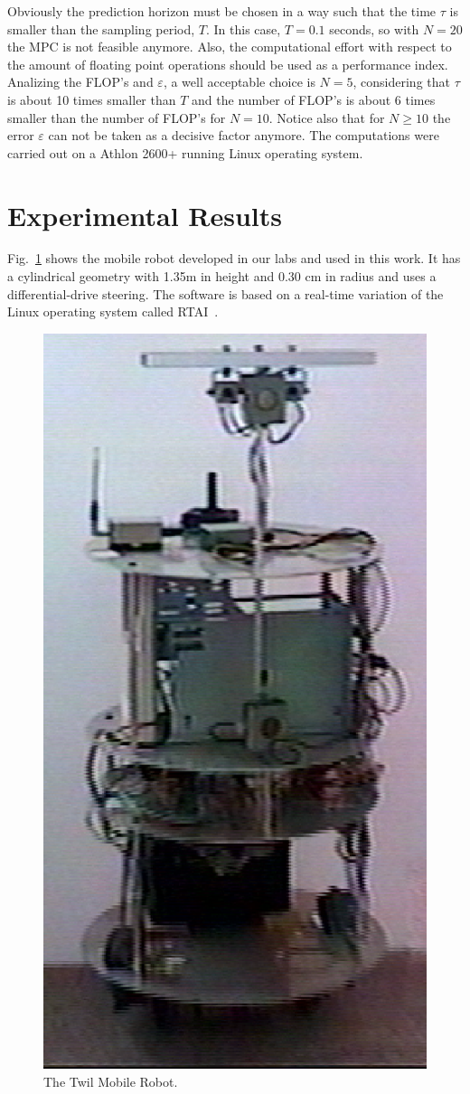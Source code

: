 \documentclass[conference]{IEEEtran} %
\begin{document}
Obviously the prediction horizon must be chosen in a way such that the time $\tau$ is smaller than the sampling period, $T$. In this case, $T=0.1$ seconds, so with $N=20$ the MPC is not feasible anymore. Also, the computational effort with respect to the amount of floating point operations should be used as a performance index. Analizing the FLOP's and $\varepsilon$, a well acceptable choice is $N=5$, considering that $\tau$ is about 10 times smaller than $T$ and the number of FLOP's is about 6 times smaller than the number of FLOP's for $N=10$. Notice also that for $N\geq10$ the error $\varepsilon$ can not be taken as a decisive factor anymore. The computations were carried out on a Athlon 2600+ running Linux operating system.
 
\section{Experimental Results}
\label{sec:exp}

Fig.~\ref{fig:twil} shows the mobile robot developed in our labs and used in
this work. It has a cylindrical geometry with 1.35m in height and 0.30 cm in
radius and uses a differential-drive steering. The software is based on a
real-time variation of the Linux operating system called
RTAI~\cite{Dozio:2003}.

\begin{figure}[htbp]
	\centering
	\includegraphics[width=0.65\linewidth]{Figures/twil6.ps}
	\caption{The Twil Mobile Robot.}
	\label{fig:twil}
\end{figure}
\end{document}
